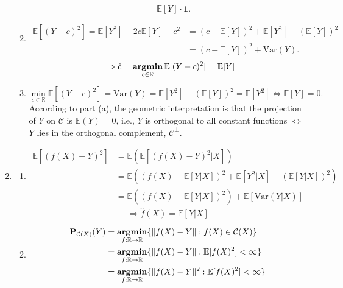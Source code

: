 \documentclass[11pt,letter,notitlepage]{article}
\DeclareMathOperator*{\argmin}{\bf argmin}
\begin{document}
\begin{solution}
\begin{enumerate}
\begin{enumerate}
\[        =
        \mathbb{E}[Y] \cdot \mathbf{1}.
        \]
        \item 
        \begin{align}
        \mathbb{E}[(Y-c)^2]
        =
        \mathbb{E}[Y^2] - 2c \mathbb{E}[Y] + c^2
        &=
        (c - \mathbb{E}[Y])^2 + \mathbb{E}[Y^2] - (\mathbb{E}[Y])^2\nonumber\\
        &=
        (c - \mathbb{E}[Y])^2 + \mathrm{Var}(Y).\nonumber
        \end{align}
        \[
        \Longrightarrow
        \hat{c}
        =
        \argmin_{c\in \mathbb{R}}\mathbb{E}[(Y-c)^2]
        =
        \mathbb{E}[Y]
        \]
        \item
        \[
        \min_{c\in \mathbb{R}}\mathbb{E}[(Y-c)^2]
        =
        \mathrm{Var}(Y)
        =
        \mathbb{E}[Y^2] - (\mathbb{E}[Y])^2
        =
        \mathbb{E}[Y^2]
        \Longleftrightarrow
        \mathbb{E}[Y] = 0.
        \]
        According to part (a), the geometric interpretation is that the projection of $Y$ on $\mathcal{C}$ is $\mathbb{E}(Y) = 0$, i.e., $Y$ is orthogonal to all constant functions $\Longleftrightarrow$ $Y$ lies in the orthogonal complement, $\mathcal{C}^\perp$.
    \end{enumerate}
    \item 
    \begin{enumerate}
        \item 
        \begin{align}
        \mathbb{E}[(f(X)-Y)^2]
        &=
        \mathbb{E}\left(\mathbb{E}[(f(X)-Y)^2|X]\right)\nonumber\\
        &=
        \mathbb{E}\left((f(X) - \mathbb{E}[Y|X])^2 + \mathbb{E}[Y^2|X] - (\mathbb{E}[Y|X])^2\right)\nonumber\\
        &=
        \mathbb{E}\left((f(X) - \mathbb{E}[Y|X])^2\right) +
        \mathbb{E}[\mathrm{Var}(Y|X)]
        \nonumber
        \end{align}
        \[
        \Longrightarrow
        \hat{f}(X) = \mathbb{E}[Y|X]
        \]
        \item 
        \begin{align*}
        \mathbf{P}_{\mathcal{C}(X)}(Y)
        &=
        \argmin_{f:\mathbb{R} \to \mathbb{R}}\{\Vert f(X) - Y \Vert: f(X) \in \mathcal{C}(X)\}\\
        &=
        \argmin_{f:\mathbb{R} \to \mathbb{R}}\{\Vert f(X) - Y \Vert: \mathbb{E}[f(X)^2] < \infty\}\\
        &=
        \argmin_{f:\mathbb{R} \to \mathbb{R}}\{\Vert f(X) - Y \Vert^2: \mathbb{E}[f(X)^2] < \infty\}\\

\end{align*}
\end{enumerate}
\end{enumerate}
\end{solution}
\end{document}
